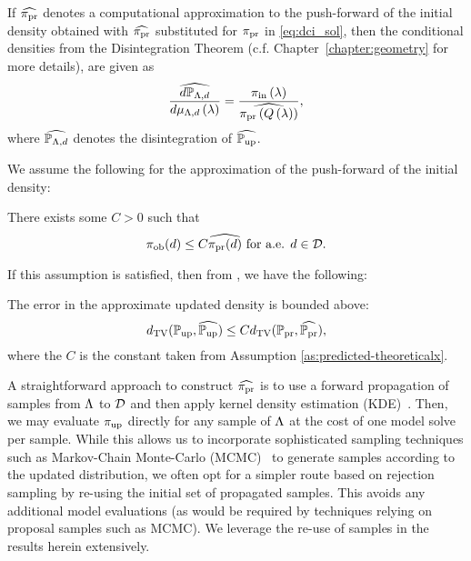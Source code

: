 
If $\widehat{\operatorname*{\pi_{pr}}}$ denotes a computational approximation to the push-forward of the initial density obtained with $\widehat{\operatorname*{\pi_{pr}}}$ substituted for $\operatorname*{\pi_{pr}}$ in \eqref{eq:dci_sol}, then the conditional densities from the Disintegration Theorem (c.f. Chapter~\ref{chapter:geometry} for more details), are given as
\[
\frac{\widehat{d\mathbb{P}_{{\Lambda}, d}}}{d\mu_{{\Lambda}, d}\left ( \lambda \right )} = \frac{\operatorname*{\pi_{in}}\left ( \lambda \right )}{ \widehat{\operatorname*{\pi_{pr}}\left ( Q\left ( \lambda \right ) \right )} },
\]
where $\widehat{\mathbb{P}_{{\Lambda}, d}}$ denotes the disintegration of $\widehat{\operatorname*{\mathbb{P}_{up}}}$.


We assume the following for the approximation of the push-forward of the initial density:
\begin{assumption}\label{as:predicted-theoreticalx}
There exists some $C>0$ such that
\[
\operatorname*{\pi_{ob}} (d) \leq C \widehat{\operatorname*{\pi_{pr}}(d)} \text{ for a.e. } d\in \mathcal{D}.
\]
\end{assumption}

If this assumption is satisfied, then from \cite{BJW18a}, we have the following:
\begin{thm}\label{thm:predicted_bound}
  The error in the approximate updated density is bounded above:
  \begin{equation}\label{eq:predicted_bound}
    d_{\text{TV}} (\operatorname*{\mathbb{P}_{up}}, \widehat{\operatorname*{\mathbb{P}_{up}}}) \leq C d_{\text{TV}} (\operatorname*{\mathbb{P}_{pr}}, \widehat{\operatorname*{\mathbb{P}_{pr}}}),
  \end{equation}
  where the $C$ is the constant taken from Assumption \ref{as:predicted-theoreticalx}.
\end{thm}

A straightforward approach to construct $\widehat{\operatorname*{\pi_{pr}}}$ is to use a forward propagation of samples from ${\Lambda}$ to $\mathcal{D}$ and then apply kernel density estimation (KDE)~\citep{BJW18a}.
Then, we may evaluate $\operatorname*{\pi_{up}}$ directly for any sample of ${\Lambda}$ at the cost of one model solve per sample.
While this allows us to incorporate sophisticated sampling techniques such as Markov-Chain Monte-Carlo (MCMC)~\citep{Smith, Tarantola_book} to generate samples according to the updated distribution, we often opt for a simpler route based on rejection sampling by re-using the initial set of propagated samples.
This avoids any additional model evaluations (as would be required by techniques relying on proposal samples such as MCMC).
We leverage the re-use of samples in the results herein extensively.

